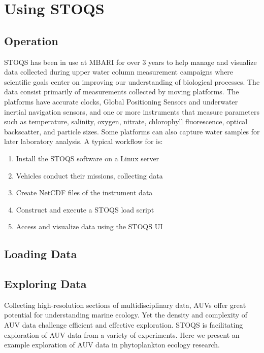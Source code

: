 \section{Using STOQS}

\subsection{Operation}

STOQS has been in use at MBARI for over 3 years to help manage and visualize data collected during upper water column measurement campaigns where scientific goals center on improving our understanding of biological processes. The data consist primarily of measurements collected by moving platforms. The platforms have accurate clocks, Global Positioning Sensors and underwater inertial navigation sensors, and one or more instruments that measure parameters such as temperature, salinity, oxygen, nitrate, chlorophyll fluorescence, optical backscatter, and particle sizes. Some platforms can also capture water samples for later laboratory analysis. A typical workflow for is:
\begin{enumerate}
\item Install the STOQS software on a Linux server
\item Vehicles conduct their missions, collecting data
\item Create NetCDF files of the instrument data
\item Construct and execute a STOQS load script
\item Access and visualize data using the STOQS UI
\end{enumerate}


\subsection{Loading Data}

\subsection{Exploring Data}
Collecting high-resolution sections of multidisciplinary data, AUVs offer great potential for understanding marine ecology.  Yet the density and complexity of AUV data challenge efficient and effective exploration.  STOQS is facilitating exploration of AUV data from a variety of experiments.  Here we present an example exploration of AUV data in phytoplankton ecology research.

